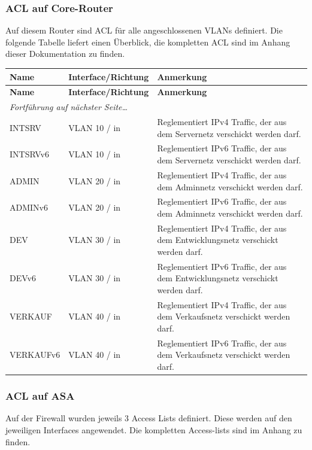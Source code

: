 \documentclass[11pt,a4paper,parskip=half]{scrartcl}
\begin{document}
\subsubsection{ACL auf Core-Router}
Auf diesem Router sind ACL für alle angeschlossenen VLANs definiert. Die folgende Tabelle liefert einen Überblick, die kompletten ACL sind im Anhang dieser Dokumentation zu finden.
\begin{longtable}{p{2.5cm}|p{3.5cm}|p{7cm}}
	\textbf{Name} & \textbf{Interface/Richtung} & \textbf{Anmerkung}\\
	\hline
	\endfirsthead
	\textbf{Name} & \textbf{Interface/Richtung} & \textbf{Anmerkung}\\
	\hline
	\endhead
	\hline
	\multicolumn{2}{l}{\textit{Fortführung auf nächster Seite\ldots}} \\
	\endfoot
	\endlastfoot
	INTSRV & VLAN 10 / in & Reglementiert IPv4 Traffic, der aus dem Servernetz verschickt werden darf.\\
	INTSRVv6 & VLAN 10 / in & Reglementiert IPv6 Traffic, der aus dem Servernetz verschickt werden darf.\\
	ADMIN & VLAN 20 / in & Reglementiert IPv4 Traffic, der aus dem Adminnetz verschickt werden darf.\\
	ADMINv6 & VLAN 20 / in & Reglementiert IPv6 Traffic, der aus dem Adminnetz verschickt werden darf.\\
	DEV & VLAN 30 / in & Reglementiert IPv4 Traffic, der aus dem Entwicklungsnetz verschickt werden darf.\\
	DEVv6 & VLAN 30 / in & Reglementiert IPv6 Traffic, der aus dem Entwicklungsnetz verschickt werden darf.\\
	VERKAUF & VLAN 40 / in & Reglementiert IPv4 Traffic, der aus dem Verkaufsnetz verschickt werden darf.\\
	VERKAUFv6 & VLAN 40 / in & Reglementiert IPv6 Traffic, der aus dem Verkaufsnetz verschickt werden darf.\\
\end{longtable}

\subsubsection{ACL auf ASA}
Auf der Firewall wurden jeweils 3 Access Lists definiert. Diese werden auf den jeweiligen Interfaces angewendet. Die kompletten Access-lists sind im Anhang zu finden.
\end{document}
